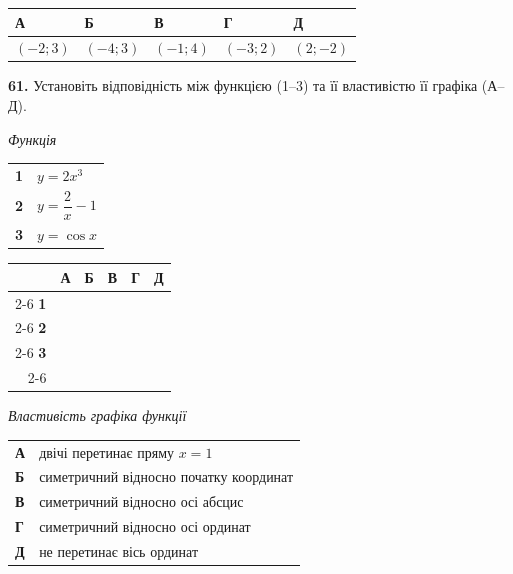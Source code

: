 \documentclass[14pt]{extarticle}
\newcommand{\answerGrid}{
    \begingroup
    \renewcommand{\arraystretch}{1.3} 
    \setlength{\tabcolsep}{7pt} 
    \begin{tabular}{r|c|c|c|c|c|}
         \multicolumn{1}{c}{} & \multicolumn{1}{c}{\textbf{А}} & \multicolumn{1}{c}{\textbf{Б}} & \multicolumn{1}{c}{\textbf{В}} & \multicolumn{1}{c}{\textbf{Г}} & \multicolumn{1}{c}{\textbf{Д}} \\ \cline{2-6}
         \textbf{1} & & & & & \\ \cline{2-6}
         \textbf{2} & & & & & \\ \cline{2-6}
         \textbf{3} & & & & & \\ \cline{2-6}
    \end{tabular}
    \endgroup
}
\newcommand{\answerTable}[5]{
\begin{center}
\begin{tabular}{|*{5}{>{\centering\arraybackslash}m{2.8cm}|}}
\hline
\rule[-0.3cm]{0pt}{0.8cm}\textbf{А} & \textbf{Б} & \textbf{В} & \textbf{Г} & \textbf{Д} \\
\hline
\rule[-0.4cm]{0pt}{1.0cm}#1 & \rule[-0.4cm]{0pt}{1.0cm}#2 & \rule[-0.4cm]{0pt}{1.0cm}#3 & \rule[-0.4cm]{0pt}{1.0cm}#4 & \rule[-0.4cm]{0pt}{1.0cm}#5 \\
\hline
\end{tabular}
\end{center}
}
\begin{document}
\vspace{0.3cm}
\answerTable{$(-2; 3)$}{$(-4; 3)$}{$(-1; 4)$}{$(-3; 2)$}{$(2; -2)$}

\vspace{0.7cm}

\noindent\textbf{61.} Установіть відповідність між функцією (1--3) та її властивістю її графіка (А--Д).

\vspace{0.3cm}

\noindent
\begin{minipage}[t]{0.45\textwidth}
    \textit{Функція} \par \vspace{0.2cm}
    \begin{tabular}{@{}p{0.5cm} l@{}}
    \textbf{1} & $y=2x^3$ \\[0.4cm]
    \textbf{2} & $y=\dfrac{2}{x}-1$ \\[0.4cm]
    \textbf{3} & $y=\cos x$ \\
    \end{tabular}

    \vspace{1.0cm}
    \answerGrid
\end{minipage}%
\hfill
\begin{minipage}[t]{0.50\textwidth}
    \textit{Властивість графіка функції} \par \vspace{0.2cm}
    \begin{tabular}{@{}p{0.5cm} p{7cm}@{}}
    \textbf{А} & двічі перетинає пряму $x=1$ \\[0.2cm]
    \textbf{Б} & симетричний відносно початку координат \\[0.2cm]
    \textbf{В} & симетричний відносно осі абсцис \\[0.2cm]
    \textbf{Г} & симетричний відносно осі ординат \\[0.2cm]
    \textbf{Д} & не перетинає вісь ординат \\
    \end{tabular}
\end{minipage}

\vspace{0.7cm}
\end{document}

